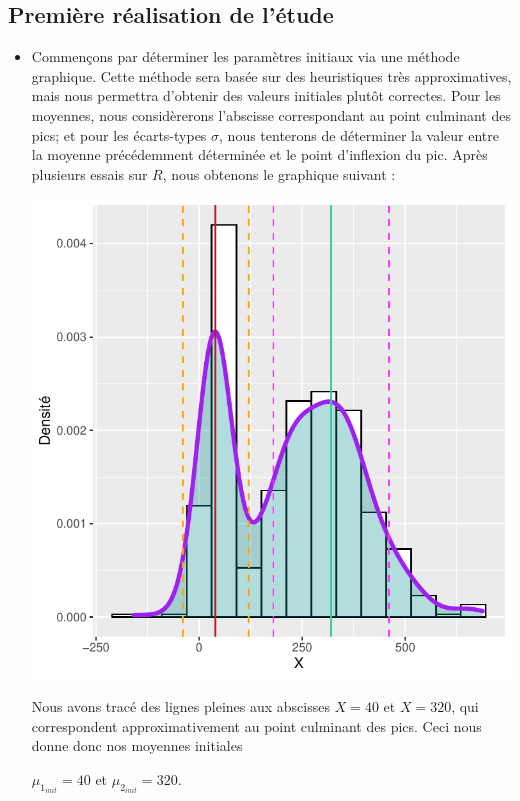 \documentclass[frenchb]{report}
\newcommand{\1}{\mathbbm{1}}
\theoremstyle{definition}\newtheorem{defn}{Définition}
\theoremstyle{definition}\newtheorem{exm}{Exemple}
\theoremstyle{definition}\newtheorem{nota}{Notation}
\theoremstyle{definition}\newtheorem{rem}{Remarque}
\begin{document}
\subsection{Première réalisation de l'étude}
\begin{itemize}[label=\adfflowerleft]
\item
Commençons par déterminer les paramètres initiaux via une méthode graphique. Cette méthode sera basée sur des heuristiques très approximatives, mais nous permettra d'obtenir des valeurs initiales plutôt correctes. \newline
Pour les moyennes, nous considèrerons l'abscisse correspondant au point culminant des pics; et pour les écarts-types $\sigma$, nous tenterons de déterminer la valeur entre la moyenne précédemment déterminée et le point d'inflexion du pic. Après plusieurs essais sur $R$, nous obtenons le graphique suivant :
\begin{center}
\includegraphics[scale=0.8]{dens_1bis.pdf}
\end{center}
Nous avons tracé des lignes pleines aux abscisses $X=40$ et $X=320$, qui correspondent approximativement au point culminant des pics. Ceci nous donne donc nos moyennes initiales 
\begin{center} 
$\mu_{1_{init}} =  40$ et $\mu_{2_{init}} = 320$. 
\end{center}

\end{itemize}
\end{document}
